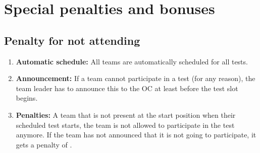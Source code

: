 \newcommand{\penaltybig}{500~}
\newcommand{\penaltysmall}{250~}


\section{Special penalties and bonuses}\label{sec:special_awards}

\subsection{Penalty for not attending}\label{rule:not_attending}
\begin{enumerate}
	\item \textbf{Automatic schedule:} All teams are automatically scheduled for all tests.

	\item \textbf{Announcement:} If a team cannot participate in a test (for any reason), the team leader has to announce this to the OC at least  before the test slot begins.

	\item \textbf{Penalties:} A team that is not present at the start position when their scheduled test starts, the team is not allowed to participate in the test anymore.
	If the team has not announced that it is not going to participate, it gets a penalty of \scoring{\penaltysmall points}.
\end{enumerate}

